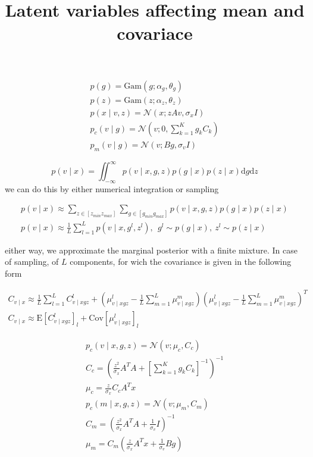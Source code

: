 \documentclass{paper}
\begin{document}
\title{Latent variables affecting mean and covariace}
\maketitle

\begin{eqnarray}
p(g) = \textrm{Gam}(g; \alpha_g,\theta_g) \\
p(z) = \textrm{Gam}(z; \alpha_z,\theta_z) \\
p(x \mid v,z) = \mathcal{N}(x; zAv,\sigma_x I) \\
p_c(v \mid g) = \mathcal{N}(v; 0,\sum_{k=1}^K g_k C_k) \\
p_m(v \mid g) = \mathcal{N}(v; Bg,\sigma_v I)
\end{eqnarray}

\begin{equation}
p(v \mid x) = \iint_{-\infty}^\infty p(v \mid x,g,z) p(g \mid x) p(z \mid x) \mathrm{d}g \mathrm{d}z
\end{equation}
%
we can do this by either numerical integration or sampling

\begin{eqnarray}
p(v \mid x) \approx \sum_{z \in \left[z_{min} z_{max} \right]}  \sum_{g \in \left[g_{min} g_{max} \right]} p(v \mid x,g,z) p(g \mid x) p(z \mid x) \\
p(v \mid x) \approx \frac{1}{L} \sum_{l=1}^L p(v \mid x,g^l,z^l), ~~ g^l \sim p(g \mid x), ~ z^l \sim p(z \mid x)
\end{eqnarray}

either way, we approximate the marginal posterior with a finite mixture. In case of sampling, of $L$ components, for wich the covariance is given in the following form

\begin{eqnarray}
C_{v \mid x} \approx \frac{1}{L} \sum_{l=1}^L C_{v \mid xgz}^l + ( \mu_{v \mid xgz}^l - \frac{1}{L} \sum_{m=1}^L \mu_{v \mid xgz}^m) ( \mu_{v \mid xgz}^l - \frac{1}{L} \sum_{m=1}^L \mu_{v \mid xgz}^m)^T \\
C_{v \mid x} \approx \mathrm{E} \left[ C_{v \mid xgz}^l \right]_l + \mathrm{Cov} \left[\mu_{v \mid xgz}^l \right]_l
\end{eqnarray}

\begin{eqnarray}
p_c(v \mid x,g,z) = \mathcal{N}(v;\mu_c,C_c) \\
C_c =  \left(\frac{z^2}{\sigma_x} A^T A + \left[\sum_{k=1}^K g_k C_k \right]^{-1}\right)^{-1} \\
\mu_c = \frac{z}{\sigma_x} C_c A^T x \\
p_c(m \mid x,g,z) = \mathcal{N}(v;\mu_m,C_m) \\
C_m =  \left(\frac{z^2}{\sigma_x} A^T A + \frac{1}{\sigma_v} I \right)^{-1} \\
\mu_m = C_m \left(\frac{z}{\sigma_x} A^T x +  \frac{1}{\sigma_v} B g \right)
\end{eqnarray}
\end{document}
